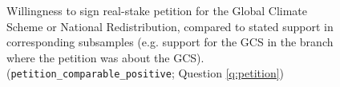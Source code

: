 



\begin{figure}[h!]
    \cprotect\caption[Willingness to sign a real-stake petition]{Willingness to sign real-stake petition for the Global Climate Scheme or National Redistribution, compared to stated support in corresponding subsamples (e.g. support for the GCS in the branch where the petition was about the GCS). (\verb|petition_comparable_positive|; Question \ref{q:petition})}\label{fig:petition}
\end{figure}

